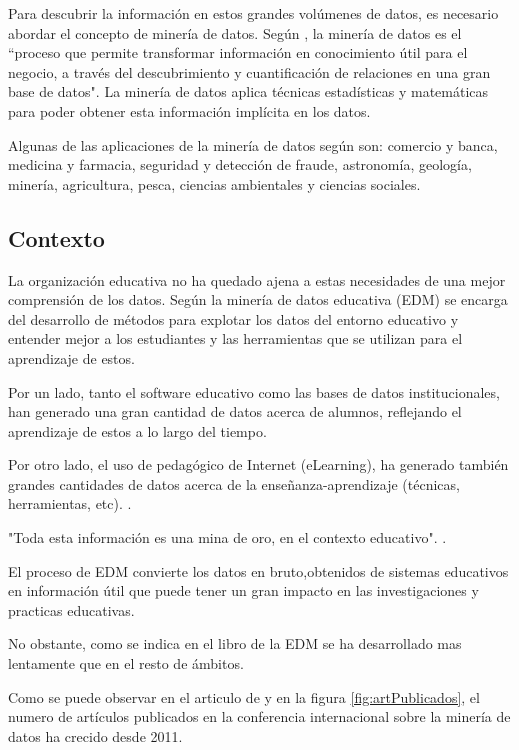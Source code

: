 Para descubrir la información en estos grandes volúmenes de datos, es necesario abordar el concepto de minería de datos.  Según , la minería de datos es el ``proceso que permite transformar información en conocimiento útil para el
negocio, a través del descubrimiento y cuantificación de relaciones en una
gran base de datos". La minería de datos aplica técnicas estadísticas y matemáticas para poder obtener esta información implícita en los datos.



Algunas de las aplicaciones de la minería de datos según \cite{riquelme2006mineria} son:  comercio y banca, medicina y farmacia, seguridad y detección de fraude, astronomía, geología, minería, agricultura, pesca, ciencias ambientales y ciencias sociales.


\subsection{Contexto}
La organización educativa no ha quedado ajena a estas necesidades de una mejor comprensión de los datos. Según  la minería de datos educativa (EDM) se encarga del desarrollo de métodos para explotar los datos del entorno educativo y entender mejor a los estudiantes y las herramientas que se utilizan para el aprendizaje de estos.

Por un lado, tanto el software educativo como las bases de datos institucionales, han generado una gran cantidad de datos acerca de alumnos, reflejando el aprendizaje de estos a lo largo del tiempo. \cite{romero2010educational}

Por otro lado, el uso de pedagógico de Internet (eLearning), ha generado también grandes cantidades de datos acerca de la enseñanza-aprendizaje (técnicas, herramientas, etc). \cite{romero2010educational}.

"Toda esta información es una mina de oro, en el contexto educativo". \cite{romero2010educational}.

El proceso de EDM convierte los datos en bruto,obtenidos de sistemas educativos en información útil que puede tener un gran impacto en las investigaciones y practicas educativas. \cite{romero2010educational}

No obstante, como se indica en el libro de \cite{inbook} la EDM se ha desarrollado mas lentamente que en el resto de ámbitos.

Como se puede observar en el articulo de  y en la figura \ref{fig:artPublicados}, el numero de artículos publicados en la conferencia internacional sobre la minería de datos ha crecido desde 2011. 

